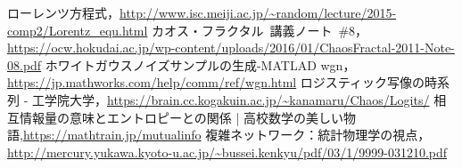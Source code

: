 \documentclass[autodetect-engine,dvipdfmx-if-dvi,ja=standard,a4paper,11pt]{bxjsarticle} %
\begin{document}
\begin{thebibliography}{9999}%
ローレンツ方程式，\url{http://www.isc.meiji.ac.jp/~random/lecture/2015-comp2/Lorentz_equ.html}
カオス・フラクタル\ 講義ノート\ \#8，\url{https://ocw.hokudai.ac.jp/wp-content/uploads/2016/01/ChaosFractal-2011-Note-08.pdf}
ホワイトガウスノイズサンプルの生成-MATLAD wgn，\url{https://jp.mathworks.com/help/comm/ref/wgn.html}
ロジスティック写像の時系列 - 工学院大学，\url{https://brain.cc.kogakuin.ac.jp/~kanamaru/Chaos/Logits/}
相互情報量の意味とエントロピーとの関係 | 高校数学の美しい物語,\url{https://mathtrain.jp/mutualinfo}
複雑ネットワーク：統計物理学の視点，\url{http://mercury.yukawa.kyoto-u.ac.jp/~bussei.kenkyu/pdf/03/1/9999-031210.pdf}
\end{thebibliography}

\end{document}
